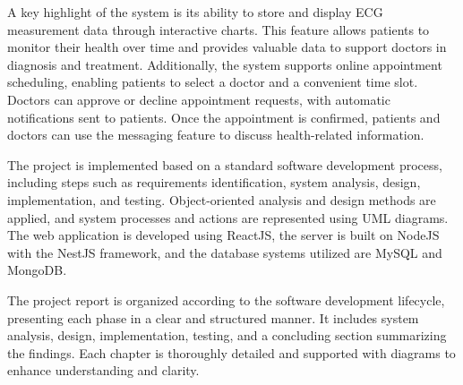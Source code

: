 A key highlight of the system is its ability to store and display ECG measurement data through interactive charts. This feature allows patients to monitor their health over time and provides valuable data to support doctors in diagnosis and treatment.
Additionally, the system supports online appointment scheduling, enabling patients to select a doctor and a convenient time slot. Doctors can approve or decline appointment requests, with automatic notifications sent to patients. Once the appointment is confirmed, patients and doctors can use the messaging feature to discuss health-related information.

The project is implemented based on a standard software development process, including steps such as requirements identification, system analysis, design, implementation, and testing. Object-oriented analysis and design methods are applied, and system processes and actions are represented using UML diagrams.
The web application is developed using ReactJS, the server is built on NodeJS with the NestJS framework, and the database systems utilized are MySQL and MongoDB.

The project report is organized according to the software development lifecycle, presenting each phase in a clear and structured manner. It includes system analysis, design, implementation, testing, and a concluding section summarizing the findings. Each chapter is thoroughly detailed and supported with diagrams to enhance understanding and clarity.

\cleardoublepage



